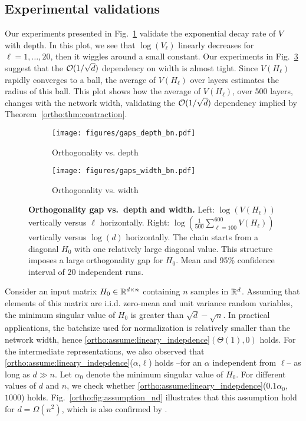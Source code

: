 \subsection{Experimental validations}
Our experiments presented in Fig.~\ref{ortho:fig:spectral_contraction_1} validate the  exponential decay rate of $V$ with depth. In this plot, we see that $\log(V_\ell)$ linearly decreases for $\ell=1, \dots, 20$, then it wiggles around a small constant.  Our experiments in Fig.~\ref{ortho:fig:spectral_contraction_2} suggest that the $\mathcal{O}(1/\sqrt{d})$ dependency on width is  almost tight. Since $V(H_\ell)$ rapidly converges to a ball, the average of $V(H_\ell)$ over layers estimates the radius of this ball. This plot shows how the average of $V(H_\ell)$, over 500 layers, changes with the network width, validating the $\mathcal{O}(1/\sqrt{d})$ dependency implied by Theorem~\ref{ortho:thm:contraction}. 
 \begin{figure}[!ht]
     \centering
     \begin{subfigure}[b]{0.4\textwidth}
         \centering
         \texttt{[image: figures/gaps\_depth\_bn.pdf]}
         \caption{Orthogonality vs. depth}
         \label{ortho:fig:spectral_contraction_1}
     \end{subfigure}
     \begin{subfigure}[b]{0.4\textwidth}
         \centering
         \texttt{[image: figures/gaps\_width\_bn.pdf]}
         \caption{Orthogonality vs. width}
         \label{ortho:fig:spectral_contraction_2}
     \end{subfigure}
    \caption{\footnotesize{\textbf{Orthogonality gap vs.\ depth and width.} Left: $\log(V(H_\ell))$ vertically versus $\ell$ horizontally. Right: $\log(\frac{1}{500}\sum_{\ell=100}^{600} V(H_\ell))$ vertically versus $\log(d)$ horizontally. The chain starts from a diagonal $H_0$ with one relatively large diagonal value. This structure imposes a large orthogonality gap for $H_0$.  Mean and 95\% confidence interval of 20 independent runs.}  }
\end{figure}

Consider an input matrix $H_0 \in \mathbb{R}^{d\times n}$ containing $n$ samples in $\mathbb{R}^d$. Assuming that elements of this matrix are i.i.d. zero-mean and unit variance random variables, the minimum singular value of $H_0$ is greater than $\sqrt{d}-\sqrt{n}$. In practical applications, the batchsize used for normalization is relatively smaller than the network width, hence  \ref{ortho:assume:lineary_indepdence}$(\Theta(1),0)$ holds. For the intermediate representations,  we also observed that  \ref{ortho:assume:lineary_indepdence}($\alpha$,$\ell$) holds --for an $\alpha$ independent from $\ell$-- as long as $d \gg n$. Let $\alpha_0$ denote the minimum singular value of $H_0$. For different values of $d$ and $n$, we check whether \ref{ortho:assume:lineary_indepdence}($0.1\alpha_0$, $1000$) holds. Fig.~\ref{ortho:fig:assumption_nd} illustrates that this assumption hold for $d= \Omega(n^2)$, which is also confirmed by \cite{daneshmand2020batch}.



